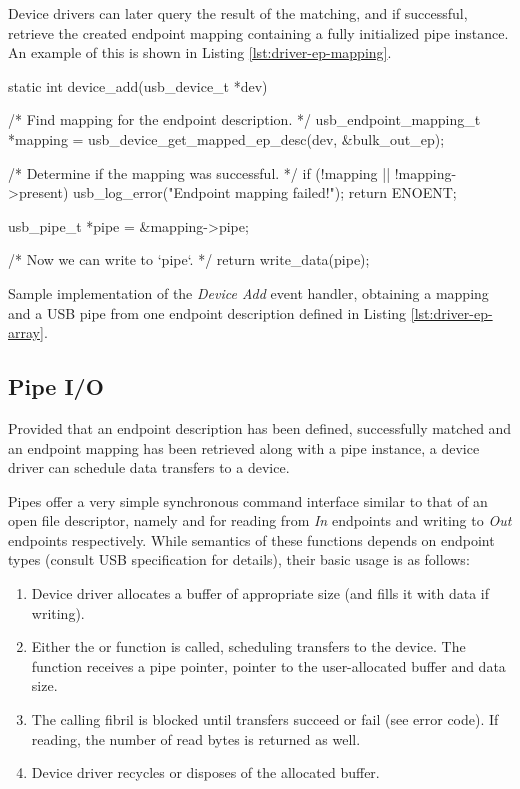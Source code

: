 Device drivers can later query the result of the matching, and if successful,
retrieve the created endpoint mapping containing a fully initialized pipe
instance. An example of this is shown in Listing \ref{lst:driver-ep-mapping}.

\begin{listing}
	\begin{code}
		static int device_add(usb_device_t *dev)
		{
			/* Find mapping for the endpoint description. */
			usb_endpoint_mapping_t *mapping = usb_device_get_mapped_ep_desc(dev, &bulk_out_ep);

			/* Determine if the mapping was successful. */
			if (!mapping || !mapping->present) {
				usb_log_error("Endpoint mapping failed!");
				return ENOENT;
			}

			usb_pipe_t *pipe = &mapping->pipe;

			/* Now we can write to `pipe`. */
			return write_data(pipe);
		}
	\end{code}
	\caption[Obtaining USB pipe from an endpoint description.]{Sample
	implementation of the \textit{Device Add} event handler, obtaining a mapping
	and a USB pipe from one endpoint description defined in Listing
	\ref{lst:driver-ep-array}.}
	\label{lst:driver-ep-mapping}
\end{listing}

\subsection{Pipe I/O}

Provided that an endpoint description has been defined, successfully matched
and an endpoint mapping has been retrieved along with a pipe instance, a device
driver can schedule data transfers to a device.

Pipes offer a very simple synchronous command interface similar to that of an
open file descriptor, namely  and  for
reading from \textit{In} endpoints and writing to \textit{Out} endpoints
respectively. While semantics of these functions depends on endpoint types
(consult USB specification for details), their basic usage is as follows:
~
\begin{enumerate}
	\item Device driver allocates a buffer of appropriate size (and fills it
		with data if writing).
	\item Either the  or  function is
		called, scheduling transfers to the device. The function receives a pipe
		pointer, pointer to the user-allocated buffer and data size.
	\item The calling fibril is blocked until transfers succeed or fail (see
		error code). If reading, the number of read bytes is returned as well.
	\item Device driver recycles or disposes of the allocated buffer.
\end{enumerate}

